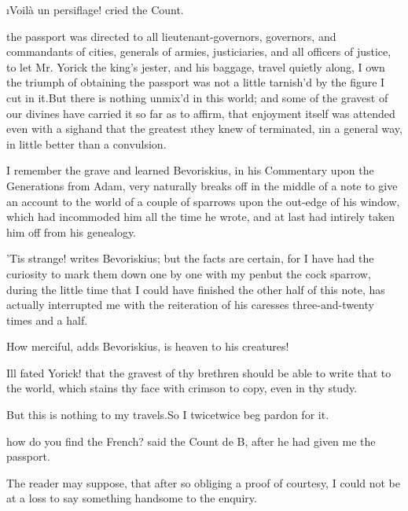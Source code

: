 \documentclass[twoside]{article}
\begin{document}
\i{Voilà un persiflage}! cried the Count.





\vskip 6pt


 the passport was directed
to all lieutenant-governors, governors,
and commandants of cities, generals of
armies, justiciaries, and all officers of
justice, to let Mr. Yorick the king’s
jester, and his baggage, travel quietly
along, I own the triumph of obtaining the
passport was not a little tarnish’d by the
figure I cut in it.\tskk But there is
nothing unmix’d in this world; and some of
the gravest of our divines have carried it
so far as to affirm, that enjoyment itself
was attended even with a sigh\tskk and
that the greatest \i{they knew of}
terminated, \i{in a general way}, in
little better than a convulsion.

I remember the grave and learned
Bevoriskius, in his Commentary upon the
Generations from Adam, very naturally
breaks off in the middle of a note to give
an account to the world of a couple of
sparrows upon the out-edge of his window,
which had incommoded him all the time he
wrote, and at last had intirely taken him
off from his genealogy.

\tskk ’Tis strange! writes Bevoriskius;
but the facts are certain, for I have had
the curiosity to mark them down one by one
with my pen\tskk but the cock sparrow,
during the little time that I could have
finished the other half of this note, has
actually interrupted me with the
reiteration of his caresses
three-and-twenty times and a half.

How merciful, adds Bevoriskius, is heaven
to his creatures!

Ill fated Yorick! that the gravest of thy
brethren should be able to write that to
the world, which stains thy face with
crimson to copy, even in thy study.

But this is nothing to my travels.\tskk So
I twice\tskk twice beg pardon for it.





\vskip 6pt


 how do you find the
French? said the Count de B\anon, after
he had given me the passport.

The reader may suppose, that after so
obliging a proof of courtesy, I could not
be at a loss to say something handsome to
the enquiry.
\end{document}
